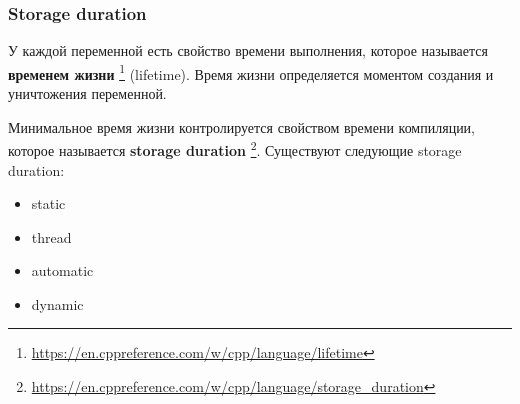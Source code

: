 \documentclass[compress, 8pt]{beamer}
\begin{document}
\begin{frame}[fragile]

    \frametitle{Storage duration}

    У каждой переменной есть свойство времени выполнения, которое называется
    \textbf{временем жизни}
    \footnote{\url{https://en.cppreference.com/w/cpp/language/lifetime}} (lifetime).
    Время жизни определяется моментом создания и уничтожения переменной.

    \hfill \break
    Минимальное время жизни контролируется свойством времени компиляции,
    которое называется \textbf{storage duration}
    \footnote{\url{https://en.cppreference.com/w/cpp/language/storage\_duration}}.
    Существуют следующие storage duration:

    \begin{itemize}
        \item static
        \item thread
        \item automatic
        \item dynamic
    \end{itemize}

\end{frame}
\end{document}
